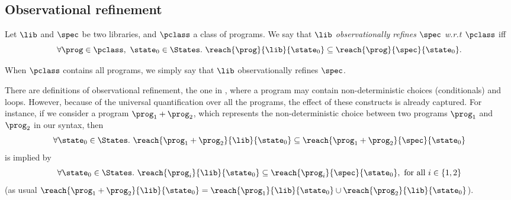 

 


\subsection{Observational refinement}\label{sec:obs_ref}

\begin{definition}
Let $\lib$ and $\spec$ be two libraries, and $\pclass$ a class of programs. We say that \emph{$\lib$ observationally refines $\spec$ w.r.t $\pclass$} iff
\[
\forall \prog\in\pclass,\ \state_0\in\States.\ \reach{\prog}{\lib}{\state_0}\subseteq \reach{\prog}{\spec}{\state_0}.
\]

When $\pclass$ contains all programs, we simply say that $\lib$ observationally refines $\spec$.
\end{definition}

There are definitions of observational refinement, \eg the one in \citet{journals/tcs/FilipovicORY10}, where a program may contain non-deterministic choices (conditionals) and loops. 
However, because of the universal quantification over all the programs, the effect of these constructs is already captured.
For instance, if we consider a program $\prog_1+\prog_2$, which represents the non-deterministic choice between two programs 
$\prog_1$ and $\prog_2$ in our syntax, 
then
\[
\forall\state_0\in\States.\ \reach{\prog_1+\prog_2}{\lib}{\state_0}\subseteq \reach{\prog_1+\prog_2}{\spec}{\state_0}
\]
is implied by 
\[
\forall \state_0\in\States.\ \reach{\prog_i}{\lib}{\state_0}\subseteq \reach{\prog_i}{\spec}{\state_0},\mbox{ for all $i\in\{1,2\}$}
\]
(as usual $\reach{\prog_1+\prog_2}{\lib}{\state_0}=\reach{\prog_1}{\lib}{\state_0}\cup \reach{\prog_2}{\lib}{\state_0}$).


